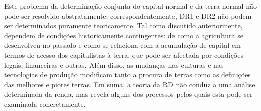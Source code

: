  \par 
Este problema da determinação conjunta do capital normal e da terra normal não pode ser resolvido abstratamente; correspondentemente, DR1 e DR2 não podem ser determinados puramente teoricamente. Tal como discutido anteriormente, dependem de condições historicamente contingentes: de como a agricultura se desenvolveu no passado e como se relaciona com a acumulação de capital em termos de acesso dos capitalistas à terra, que pode ser afectada por condições legais, financeiras e outras. Além disso, as mudanças nas culturas e nas tecnologias de produção modificam tanto a procura de terras como as definições das melhores e piores terras. Em suma, a teoria da RD não conduz a uma análise determinada da renda, mas revela alguns dos processos pelos quais esta pode ser examinada concretamente.
 \par 
